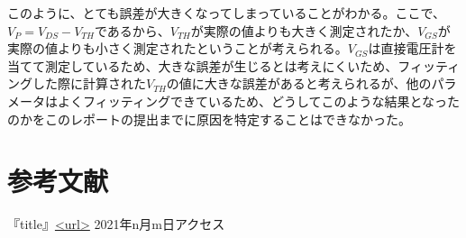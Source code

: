 \documentclass[a4j,dvipdfmx]{article}
\begin{document}
このように、とても誤差が大きくなってしまっていることがわかる。ここで、$V_{P} = V_{DS} - V_{TH}$であるから、$V_{TH}$が実際の値よりも大きく測定されたか、$V_{GS}$が実際の値よりも小さく測定されたということが考えられる。$V_{GS}$は直接電圧計を当てて測定しているため、大きな誤差が生じるとは考えにくいため、フィッティングした際に計算された$V_{TH}$の値に大きな誤差があると考えられるが、他のパラメータはよくフィッティングできているため、どうしてこのような結果となったのかをこのレポートの提出までに原因を特定することはできなかった。

\section{参考文献}
『title』\url{<url>} 2021年n月m日アクセス
\end{document}
